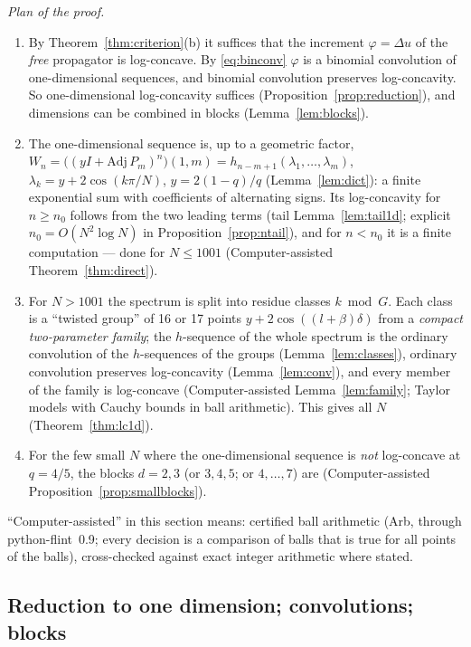 \documentclass[11pt,a4paper]{article}
\theoremstyle{definition}
\begin{document}
\emph{Plan of the proof.}
\begin{enumerate}
\item By Theorem~\ref{thm:criterion}(b) it suffices that the increment $\varphi=\Delta u$ of the \emph{free} propagator is log-concave. By \eqref{eq:binconv} $\varphi$ is a binomial convolution of one-dimensional sequences, and binomial convolution preserves log-concavity. So one-dimensional log-concavity suffices (Proposition~\ref{prop:reduction}), and dimensions can be combined in blocks (Lemma~\ref{lem:blocks}).
\item The one-dimensional sequence is, up to a geometric factor, $W_n=\bigl((yI+\mathrm{Adj}\,P_m)^n\bigr)(1,m)=h_{n-m+1}(\lambda_1,\dots,\lambda_m)$, $\lambda_k=y+2\cos(k\pi/N)$, $y=2(1-q)/q$ (Lemma~\ref{lem:dict}): a finite exponential sum with coefficients of alternating signs. Its log-concavity for $n\ge n_0$ follows from the two leading terms (tail Lemma~\ref{lem:tail1d}; explicit $n_0=O(N^2\log N)$ in Proposition~\ref{prop:ntail}), and for $n<n_0$ it is a finite computation --- done for $N\le1001$ (Computer-assisted Theorem~\ref{thm:direct}).
\item For $N>1001$ the spectrum is split into residue classes $k\bmod G$. Each class is a ``twisted group'' of 16 or 17 points $y+2\cos((l+\beta)\delta)$ from a \emph{compact two-parameter family}; the $h$-sequence of the whole spectrum is the ordinary convolution of the $h$-sequences of the groups (Lemma~\ref{lem:classes}), ordinary convolution preserves log-concavity (Lemma~\ref{lem:conv}), and every member of the family is log-concave (Computer-assisted Lemma~\ref{lem:family}; Taylor models with Cauchy bounds in ball arithmetic). This gives all $N$ (Theorem~\ref{thm:lc1d}).
\item For the few small $N$ where the one-dimensional sequence is \emph{not} log-concave at $q=4/5$, the blocks $d=2,3$ (or $3,4,5$; or $4,\dots,7$) are (Computer-assisted Proposition~\ref{prop:smallblocks}).
\end{enumerate}
``Computer-assisted'' in this section means: certified ball arithmetic (Arb, through python-flint~0.9; every decision is a comparison of balls that is true for all points of the balls), cross-checked against exact integer arithmetic where stated.

\subsection{Reduction to one dimension; convolutions; blocks}\label{sec:blocks}
\end{document}
